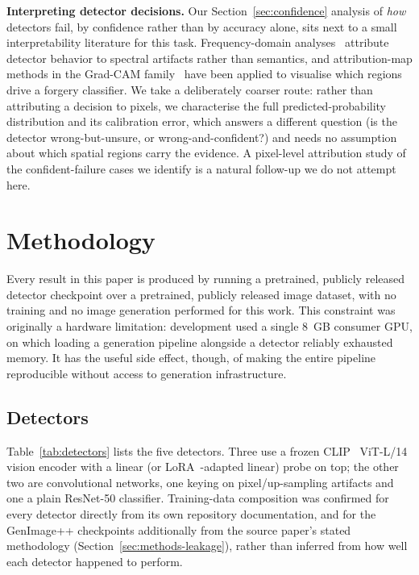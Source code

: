 \documentclass[3p,times,procedia]{elsarticle}
\begin{document}
\textbf{Interpreting detector decisions.} Our Section~\ref{sec:confidence}
analysis of \emph{how} detectors fail, by confidence rather than by
accuracy alone, sits next to a small interpretability literature for this
task. Frequency-domain analyses~\cite{qian2020freq,frank2020leveraging}
attribute detector behavior to spectral artifacts rather than semantics,
and attribution-map methods in the Grad-CAM family~\cite{selvaraju2017gradcam}
have been applied to visualise which regions drive a forgery
classifier. We take a deliberately coarser route: rather than attributing a
decision to pixels, we characterise the full predicted-probability
distribution and its calibration error, which answers a different question
(is the detector wrong-but-unsure, or wrong-and-confident?) and needs no
assumption about which spatial regions carry the evidence. A pixel-level
attribution study of the confident-failure cases we identify is a natural
follow-up we do not attempt here.

\section{Methodology}
\label{sec:methods}

Every result in this paper is produced by running a pretrained,
publicly released detector checkpoint over a pretrained, publicly released
image dataset, with no training and no image generation performed for this
work. This constraint was originally a hardware limitation: development
used a single 8~GB consumer GPU, on which loading a generation pipeline
alongside a detector reliably exhausted memory. It has the useful side
effect, though, of making the entire pipeline reproducible without access
to generation infrastructure.

\subsection{Detectors}

Table~\ref{tab:detectors} lists the five detectors. Three use a frozen
CLIP~\cite{radford2021clip} ViT-L/14 vision encoder with a linear (or
LoRA~\cite{hu2022lora}-adapted linear) probe on top; the other two are
convolutional networks, one keying on pixel/up-sampling artifacts and one a
plain ResNet-50 classifier. Training-data composition was confirmed for
every detector directly from its own repository documentation, and for the
GenImage++ checkpoints additionally from the source paper's stated
methodology (Section~\ref{sec:methods-leakage}), rather than inferred from
how well each detector happened to perform.
\end{document}
